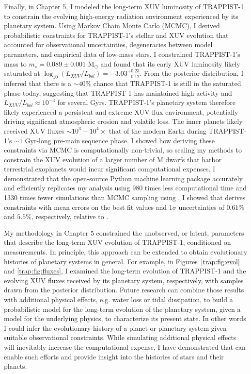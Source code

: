 Finally, in Chapter 5, I modeled the long-term XUV luminosity of TRAPPIST-1 to constrain the evolving high-energy radiation environment experienced by its planetary system. Using Markov Chain Monte Carlo (MCMC), I derived probabilistic constraints for TRAPPIST-1's stellar and XUV evolution that accounted for observational uncertainties, degeneracies between model parameters, and empirical data of low-mass stars. I constrained TRAPPIST-1's mass to $m_{\star} = 0.089 \pm{0.001}$ M$_{\odot}$ and found that its early XUV luminosity likely saturated at $\log_{10}(L_{XUV}/L_{bol}) = -3.03^{+0.23}_{-0.12}$. From the posterior distribution, I inferred that there is a ${\sim}40\%$ chance that TRAPPIST-1 is still in the saturated phase today, suggesting that TRAPPIST-1 has maintained high activity and $L_{XUV}/L_{bol} \approx 10^{-3}$ for several Gyrs. TRAPPIST-1's planetary system therefore likely experienced a persistent and extreme XUV flux environment, potentially driving significant atmospheric erosion and volatile loss. The inner planets likely received XUV fluxes ${\sim}10^3 - 10^4\times$ that of the modern Earth during TRAPPIST-1's ${\sim}1$ Gyr-long pre-main sequence phase. I showed how deriving these constraints via MCMC is computationally non-trivial, so scaling my methods to constrain the XUV evolution of a larger number of M dwarfs that harbor terrestrial exoplanets would incur significant computational expenses. I demonstrated that the open-source Python machine learning package \approxposterior accurately and efficiently replicates my analysis using 980 times less computational time and 1330 times fewer simulations than MCMC sampling using \emcee. I showed that \approxposterior derives constraints with mean errors on the best fit values and $1\sigma$ uncertainties of $0.61\%$ and $5.5\%$, respectively, relative to \emcee.

My methodology in Chapter 5 constrained the unobserved, or latent, parameters that describe the long-term XUV evolution of TRAPPIST-1, conditioned on measurements. In principle, this approach can be extended to obtain evolutionary histories of planetary systems in general.  For example, in Figures~\ref{trap:fig:evol} and \ref{trap:fig:fluxes}, I examined the long-term evolution of TRAPPIST-1 and the evolving XUV fluxes received by its planetary system, respectively, with samples drawn from the posterior distribution. Future research can combine those results with additional physical effects, e.g. water loss or tidal dissipation, to build a probabilistic model for the long-term evolution of the planetary system, given a model for the underlying physics, to characterize its present state. In other words I could infer the evolutionary history of a planet or planetary system given suitable observational constraints. While simulating additional physical effects will inevitably increase the computational expense, I have demonstrated that \approxposterior can enable such efforts and provide insight into the histories of stars and their planets.
